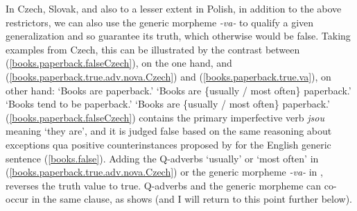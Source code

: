 \documentclass[output=paper,colorlinks,citecolor=brown]{langscibook}
\begin{document}
In Czech, Slovak, and also to a lesser extent in Polish, in addition to the above restrictors, we can also
use the generic morpheme \textit{-va-} to qualify a given generalization and so guarantee its truth, which otherwise
would be false.  Taking examples from Czech,
this can be illustrated by
the contrast between (\ref{books.paperback.falseCzech}), on the one hand, and (\ref{books.paperback.true.adv.nova.Czech}) and (\ref{books.paperback.true.va}), on other hand:
\ea\label{books.paperback-toplevel}
  
\glt `Books are paperback.'
 
\glt `Books are \{usually / most often\} paperback.'
 
\glt `Books tend to be paperback.'
 
\glt `Books are \{usually / most often\} paperback.'
\z
\z
\noindent
(\ref{books.paperback.falseCzech}) contains
the primary imperfective verb \textit{jsou} meaning `they are', and it is judged false based on the same reasoning about exceptions qua positive counterinstances proposed by \citet{leslie2008} for the English generic sentence (\ref{books.false}).
Adding the Q-adverbs `usually' or `most often' in (\ref{books.paperback.true.adv.nova.Czech})
or the generic morpheme \textit{-va-} in ,
reverses the truth value to true.
Q-adverbs and the generic morpheme can co-occur in the same clause, as  shows (and I will return to this point further below).
\end{document}
